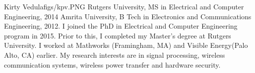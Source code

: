 \documentclass[twocolumn,letterpaper]{IEEEAerospaceCLS}  %
\begin{document}
\begin{biographywithpic}
{Kirty Vedula}{figs/kpv.PNG}
Rutgers University, MS in Electrical and Computer Engineering, 2014 Amrita University, B Tech in Electronics and Communications Engineering, 2012. I joined the PhD in Electrical and Computer Engineering program in 2015. Prior to this, I completed my Master's degree at Rutgers University. I worked at Mathworks (Framingham, MA) and Visible Energy(Palo Alto, CA) earlier. My research interests are in signal processing, wireless communication systems, wireless power transfer and hardware security.
\end{biographywithpic}
\end{document}
